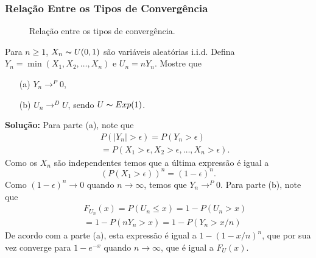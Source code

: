 %
\begin{frame}
\frametitle{\textbf{Relação Entre os Tipos de Convergência}}
%
%
%
\begin{figure}[ht]
\centering \epsfxsize=6cm  \caption{Relação
entre os tipos de convergência.} \label{fig:rel_conv}
\end{figure}

%
\end{frame}
%
\begin{frame}
%
%
%
\begin{exem}
Para $n\geq 1$, $X_n\thicksim U(0,1)$ são variáveis aleatórias
i.i.d. Defina $Y_n=\min(X_1,X_2,\ldots,X_n)$ e $U_n=nY_n$. Mostre
que
\begin{enumerate}
\item[(a)] $Y_n\rightarrow^P 0$,
\item[(b)] $U_n\rightarrow^D U$, sendo $U\thicksim Exp(1)$.
\end{enumerate}
%
%
%
%
{\bf Solução:} Para parte (a), note que
\begin{eqnarray}
& & P(|Y_n|>\epsilon)=P(Y_n>\epsilon)\nonumber\\
& & =P(X_1>\epsilon,X_2>\epsilon,\ldots,X_n>\epsilon).\nonumber
\end{eqnarray}
Como os $X_n$ são independentes temos que a última expressão é igual
a
$$(P(X_1>\epsilon))^n=(1-\epsilon)^n.$$
Como $(1-\epsilon)^n\rightarrow 0$ quando $n\rightarrow\infty$,
temos que $Y_n\rightarrow^P 0$.
%
%
%
%
Para parte (b), note que
\begin{eqnarray}
& & F_{U_n}(x)=P(U_n\leq x) =1-P(U_n> x)\nonumber\\
& &=1-P(nY_n>x)=1-P(Y_n>x/n)\nonumber
\end{eqnarray}
De acordo com a parte (a), esta expressão é igual a $1-(1-x/n)^n$,
que por sua vez converge para $1-e^{-x}$ quando
$n\rightarrow\infty$, que é igual a $F_U(x)$.
\end{exem}
%
\end{frame}
